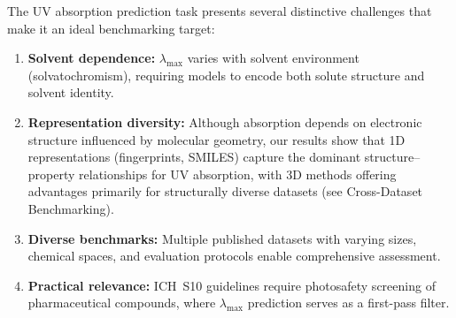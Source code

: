 The UV absorption prediction task presents several distinctive challenges that make it an ideal benchmarking target:
\begin{enumerate}
    \item \textbf{Solvent dependence:} $\lambda_{\max}$ varies with solvent environment (solvatochromism), requiring models to encode both solute structure and solvent identity.
    \item \textbf{Representation diversity:} Although absorption depends on electronic structure influenced by molecular geometry, our results show that 1D representations (fingerprints, SMILES) capture the dominant structure--property relationships for UV absorption, with 3D methods offering advantages primarily for structurally diverse datasets (see Cross-Dataset Benchmarking).
    \item \textbf{Diverse benchmarks:} Multiple published datasets with varying sizes, chemical spaces, and evaluation protocols enable comprehensive assessment.
    \item \textbf{Practical relevance:} ICH~S10 guidelines require photosafety screening of pharmaceutical compounds, where $\lambda_{\max}$ prediction serves as a first-pass filter.
\end{enumerate}

